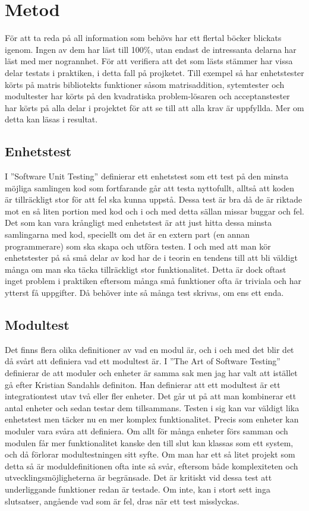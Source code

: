 \section{Metod}
	För att ta reda på all information som behövs har ett flertal böcker blickats igenom. Ingen av dem har läst till 100\%, utan endast de intressanta delarna har läst med mer nogrannhet. För att verifiera att det som lästs stämmer har vissa delar testats i praktiken, i detta fall på projketet. Till exempel så har enhetstester körts på matris bibliotekts funktioner såsom matrisaddition, sytemtester och modultester har körts på den kvadratiska problem-lösaren och acceptanstester har körts på alla delar i projektet för att se till att alla krav är uppfyllda. Mer om detta kan läsas i resultat.
	
\subsection{Enhetstest}
	I ''Software Unit Testing'' \citep{ivv} definierar ett enhetstest som ett test på den minsta möjliga samlingen kod som fortfarande går att testa nyttofullt, alltså att koden är tillräckligt stor för att fel ska kunna uppstå. Dessa test är bra då de är riktade mot en så liten portion med kod och i och med detta sällan missar buggar och fel. Det som kan vara krångligt med enhetstest är att just hitta dessa minsta samlingarna med kod, speciellt om det är en extern part (en annan programmerare) som ska skapa och utföra testen. I och med att man kör enhetstester på så små delar av kod har de i teorin en tendens till att bli väldigt många om man ska täcka tillräckligt stor funktionalitet. Detta är dock oftast inget problem i praktiken eftersom många små funktioner ofta är triviala och har ytterst få uppgifter. Då behöver inte så många test skrivas, om ens ett enda.
\subsection{Modultest}	
	Det finns flera olika definitioner av vad en modul är, och i och med det blir det då svårt att definiera vad ett modultest är. I ''The Art of Software Testing'' definierar de att moduler och enheter är samma sak men jag har valt att istället gå efter Kristian Sandahls definiton. Han definierar att ett modultest är ett integrationtest utav två eller fler enheter. Det går ut på att man kombinerar ett antal enheter och sedan testar dem tillsammans. Testen i sig kan var väldigt lika enhetstest men täcker nu en mer komplex funktionalitet. Precis som enheter kan moduler vara svåra att definiera. Om allt för många enheter förs samman och modulen får mer funktionalitet kanske den till slut kan klassas som ett system, och då förlorar modultestningen sitt syfte. Om man har ett så litet projekt som detta så är moduldefinitionen ofta inte så svår, eftersom både komplexiteten och utvecklingsmöjligheterna är begränsade. Det är kritiskt vid dessa test att underliggande funktioner redan är testade. Om inte, kan i stort sett inga slutsatser, angående vad som är fel, dras när ett test misslyckas.
